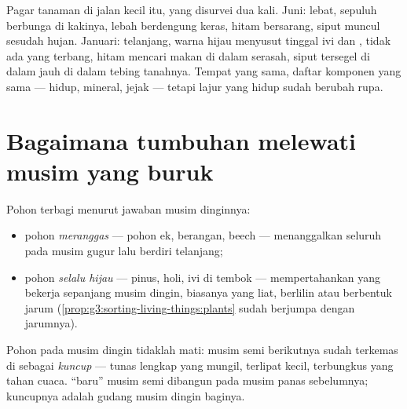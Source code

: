 \begin{example}\label{ex:g6:life-through-seasons:hedge}
Pagar tanaman di jalan kecil itu, yang disurvei dua kali. Juni: 
lebat, sepuluh   berbunga di kakinya, lebah berdengung
keras,  hitam bersarang, siput muncul sesudah hujan. Januari:
 telanjang, warna hijau menyusut tinggal ivi dan , tidak
ada  yang terbang,  hitam mencari makan di dalam
serasah, siput tersegel di dalam  jauh di dalam tebing
tanahnya. Tempat yang sama, daftar komponen yang sama --- hidup,
mineral, jejak --- tetapi lajur yang hidup sudah berubah rupa.
\end{example}

\section{Bagaimana tumbuhan melewati musim yang buruk}

\begin{definition}\label{def:g6:life-through-seasons:trees}
Pohon terbagi menurut jawaban musim dinginnya:
\begin{itemize}
  \item pohon \emph{meranggas} --- pohon ek, berangan,
        beech --- menanggalkan seluruh  pada musim gugur lalu
        berdiri telanjang;
  \item pohon \emph{selalu hijau} --- pinus, holi,
        ivi di tembok --- mempertahankan  yang bekerja sepanjang
        musim dingin, biasanya  yang liat, berlilin atau berbentuk
        jarum (\cref{prop:g3:sorting-living-things:plants} sudah
        berjumpa dengan jarumnya).
\end{itemize}
\end{definition}

\begin{definition}[Kuncup]\label{def:g6:life-through-seasons:buds}
Pohon  pada musim dingin tidaklah mati: musim semi berikutnya
sudah terkemas di  sebagai \emph{kuncup} ---
tunas lengkap yang mungil,  terlipat kecil, terbungkus 
yang tahan cuaca.  ``baru'' musim semi dibangun pada musim panas
sebelumnya; kuncupnya adalah gudang musim dingin baginya.
\end{definition}

